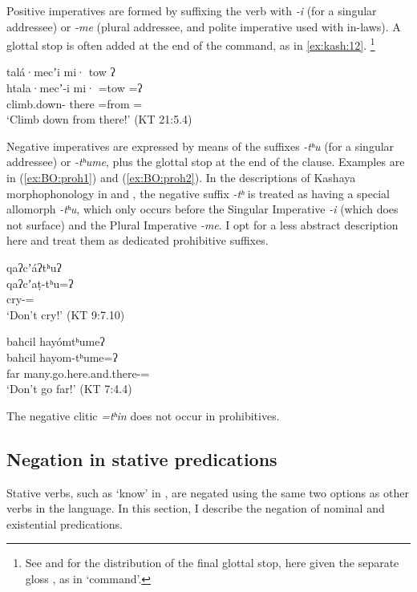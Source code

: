 \documentclass[output=paper,modfonts,nonflat,colorlinks,citecolor=brown]{langscibook}
\begin{document}
Positive imperatives are formed by suffixing the verb with \textit{-i} (for a singular addressee) or \textit{-me} (plural addressee, and polite imperative used with in-laws). A glottal stop is often added at the end of the command, as in \ref{ex:kash:12}.%
\footnote{%
See \citet[335--336]{Buckley1994} and \citet{Buckley2015} for the distribution of the final glottal stop, here given the separate gloss , as in `command'.
} %


{%
\ea\label{ex:kash:12}
\glll talá·mecʼi mi· tow ʔ\\
    htala·mecʼ-i mi· =tow =ʔ\\
    climb.down- there =from =\\
\glt `Climb down from there!' ({KT 21:5.4})\\
\z
}%

Negative imperatives are expressed by means of the suffixes \textit{-tʰu} (for a singular addressee) or \textit{-tʰume}, plus the glottal stop at the end of the clause.
Examples are in (\ref{ex:BO:proh1}) and (\ref{ex:BO:proh2}). In the descriptions of Kashaya morphophonology in \citet{Oswalt1961} and \citet{Buckley1994}, the negative suffix \textit{-tʰ} is treated as having a special allomorph \textit{-tʰu}, which only occurs before the Singular Imperative \textit{-i} (which does not surface) and the Plural Imperative \textit{-me}. I opt for a less abstract description here and treat them as dedicated prohibitive suffixes.

{%
\ea 
\label{ex:BO:proh1}
\glll qaʔcʼáʔtʰuʔ\\
    qaʔcʼaṭ-tʰu=ʔ\\
    cry-=\\
\glt `Don't cry!' ({KT 9:7.10})\\
\z
}%

\ea 
\label{ex:BO:proh2}
\glll bahcil hayómtʰumeʔ \\
    bahcil hayom-tʰume=ʔ\\
    far many.go.here.and.there-=\\
 `Don't go far!' ({KT 7:4.4})\\
\z

The negative clitic \textit{=tʰin} does not occur in prohibitives.

\subsection{Negation in stative predications}\label{sec:BO:nonverb} 
Stative verbs, such as `know' in , are negated using the same two options as other verbs in the language. In this section, I describe the negation of nominal and existential predications.
\end{document}
